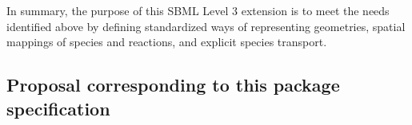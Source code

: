 In summary, the purpose of this SBML Level 3 extension is to meet the needs identified above by defining standardized ways of representing geometries, spatial mappings of species and reactions, and explicit species transport.







\pagebreak

\subsection{Proposal corresponding to this package specification}

